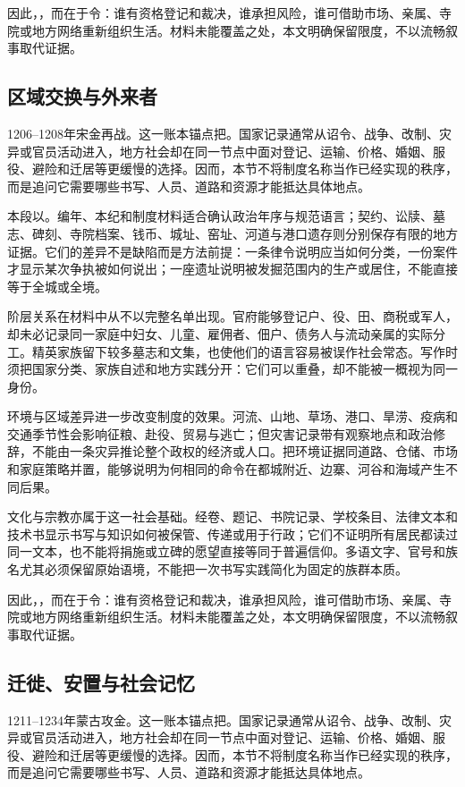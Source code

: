 因此，，而在于令：谁有资格登记和裁决，谁承担风险，谁可借助市场、亲属、寺院或地方网络重新组织生活。材料未能覆盖之处，本文明确保留限度，不以流畅叙事取代证据。

\subsection{区域交换与外来者}

1206--1208年宋金再战。这一账本锚点把。国家记录通常从诏令、战争、改制、灾异或官员活动进入，地方社会却在同一节点中面对登记、运输、价格、婚姻、服役、避险和迁居等更缓慢的选择。因而，本节不将制度名称当作已经实现的秩序，而是追问它需要哪些书写、人员、道路和资源才能抵达具体地点。

本段以。编年、本纪和制度材料适合确认政治年序与规范语言；契约、讼牍、墓志、碑刻、寺院档案、钱币、城址、窑址、河道与港口遗存则分别保存有限的地方证据。它们的差异不是缺陷而是方法前提：一条律令说明应当如何分类，一份案件才显示某次争执被如何说出；一座遗址说明被发掘范围内的生产或居住，不能直接等于全城或全境。

阶层关系在材料中从不以完整名单出现。官府能够登记户、役、田、商税或军人，却未必记录同一家庭中妇女、儿童、雇佣者、佃户、债务人与流动亲属的实际分工。精英家族留下较多墓志和文集，也使他们的语言容易被误作社会常态。写作时须把国家分类、家族自述和地方实践分开：它们可以重叠，却不能被一概视为同一身份。

环境与区域差异进一步改变制度的效果。河流、山地、草场、港口、旱涝、疫病和交通季节性会影响征粮、赴役、贸易与逃亡；但灾害记录带有观察地点和政治修辞，不能由一条灾异推论整个政权的经济或人口。把环境证据同道路、仓储、市场和家庭策略并置，能够说明为何相同的命令在都城附近、边寨、河谷和海域产生不同后果。

文化与宗教亦属于这一社会基础。经卷、题记、书院记录、学校条目、法律文本和技术书显示书写与知识如何被保管、传递或用于行政；它们不证明所有居民都读过同一文本，也不能将捐施或立碑的愿望直接等同于普遍信仰。多语文字、官号和族名尤其必须保留原始语境，不能把一次书写实践简化为固定的族群本质。

因此，，而在于令：谁有资格登记和裁决，谁承担风险，谁可借助市场、亲属、寺院或地方网络重新组织生活。材料未能覆盖之处，本文明确保留限度，不以流畅叙事取代证据。

\subsection{迁徙、安置与社会记忆}

1211--1234年蒙古攻金。这一账本锚点把。国家记录通常从诏令、战争、改制、灾异或官员活动进入，地方社会却在同一节点中面对登记、运输、价格、婚姻、服役、避险和迁居等更缓慢的选择。因而，本节不将制度名称当作已经实现的秩序，而是追问它需要哪些书写、人员、道路和资源才能抵达具体地点。


